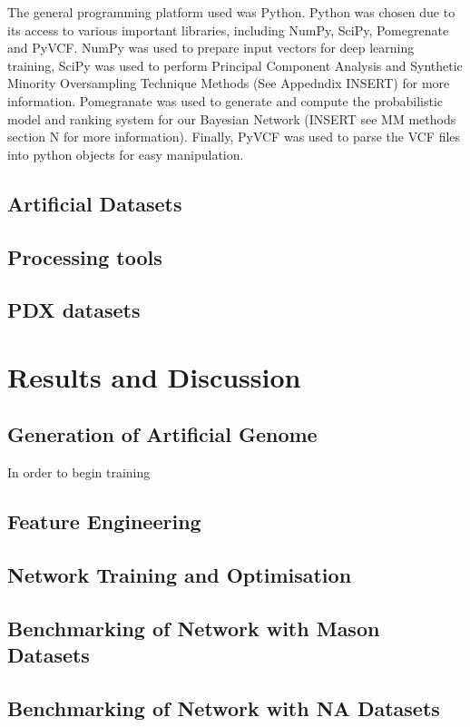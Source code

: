 \documentclass{article}
\begin{document}
The general programming platform used was Python. Python was chosen due to its access to various important libraries, including NumPy, SciPy, Pomegrenate and PyVCF. NumPy was used to prepare input vectors for deep learning training, SciPy was used to perform Principal Component Analysis and Synthetic Minority Oversampling Technique Methods (See Appedndix INSERT) for more information. Pomegranate was used to generate and compute the probabilistic model and ranking system for our Bayesian Network (INSERT see MM methods section N for more information). Finally, PyVCF was used to parse the VCF files into python objects for easy manipulation.


\subsection{Artificial Datasets}

\subsection{Processing tools}

\subsection{PDX datasets}


\section{Results and Discussion}
\subsection{Generation of Artificial Genome}
In order to begin training 

\subsection{Feature Engineering}

\subsection{Network Training and Optimisation}

\subsection{Benchmarking of Network with Mason Datasets}


\subsection{Benchmarking of Network with NA Datasets}
\end{document}
